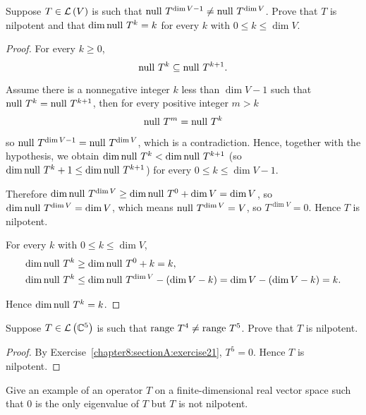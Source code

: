\begin{exercise}\label{chapter8:sectionA:exercise21}
    Suppose $T\in\mathcal{L}\left({V}\right)$ is such that $\operatorname{null}\,{T^{\dim V - 1}} \ne \operatorname{null}\,{T^{\dim V}}$. Prove that $T$ is nilpotent and that $\dim\operatorname{null}\,{T^{k}} = k$ for every $k$ with $0\leq k\leq \dim V$.
\end{exercise}

\begin{proof}
    For every $k\geq 0$,
    \[
        \operatorname{null}\,{T^{k}}\subseteq \operatorname{null}\,{T^{k+1}}.
    \]

    Assume there is a nonnegative integer $k$ less than $\dim V - 1$ such that $\operatorname{null}\,{T^{k}} = \operatorname{null}\,{T^{k+1}}$, then for every positive integer $m > k$
    \[
        \operatorname{null}\,{T^{m}} = \operatorname{null}\,{T^{k}}
    \]

    so $\operatorname{null}\,{T^{\dim V - 1}} = \operatorname{null}\,{T^{\dim V}}$, which is a contradiction. Hence, together with the hypothesis, we obtain $\dim\operatorname{null}\,{T^{k}} < \dim\operatorname{null}\,{T^{k+1}}$ (so $\dim\operatorname{null}\,{T^{k}} + 1 \leq \dim\operatorname{null}\,{T^{k+1}}$) for every $0\leq k\leq \dim V-1$.

    Therefore $\dim\operatorname{null}\,{T^{\dim V}}\geq \dim\operatorname{null}\,{T^{0}} + \dim V = \dim V$, so $\dim\operatorname{null}\,{T^{\dim V}} = \dim V$, which means $\operatorname{null}\,{T^{\dim V}} = V$, so $T^{\dim V} = 0$. Hence $T$ is nilpotent.

    For every $k$ with $0\leq k\leq \dim V$,
    \begin{align*}
        \dim\operatorname{null}\,{T^{k}} & \geq \dim\operatorname{null}\,{T^{0}} + k = k,                                         \\
        \dim\operatorname{null}\,{T^{k}} & \leq \dim\operatorname{null}\,{T^{\dim V}} - (\dim V - k) = \dim V - (\dim V - k) = k.
    \end{align*}

    Hence $\dim\operatorname{null}\,{T^{k}} = k$.
\end{proof}
\newpage

\begin{exercise}\label{chapter8:sectionA:exercise22}
    Suppose $T \in \mathcal{L}\left({\mathbb{C}^{5}}\right)$ is such that $\operatorname{range}\,{T^{4}} \ne \operatorname{range}\,{T}^{5}$. Prove that $T$ is nilpotent.
\end{exercise}

\begin{proof}
    By Exercise~\ref{chapter8:sectionA:exercise21}, $T^{5} = 0$. Hence $T$ is nilpotent.
\end{proof}
\newpage

\begin{exercise}\label{chapter8:sectionA:exercise23}
    Give an example of an operator $T$ on a finite-dimensional real vector space such that $0$ is the only eigenvalue of $T$ but $T$ is not nilpotent.
\end{exercise}


